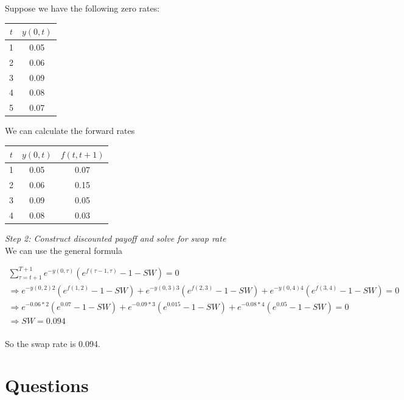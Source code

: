 Suppose we have the following zero rates:\\
\begin{center}
\begin{tabular}{|c|c|}
  \hline
  $t$ & $y(0,t)$ \\
  \hline
  1&0.05 \\
  2&0.06 \\
  3&0.09 \\
  4&0.08 \\
  5&0.07\\
  \hline
\end{tabular}
\end{center}
We can calculate the forward rates\\
\begin{center}
\begin{tabular}{|c|c|c|}
  \hline
  $t$ & $y(0,t)$ & $f(t,t+1)$ \\
  \hline
  1&0.05 & 0.07\\
  2&0.06 & 0.15\\
  3&0.09 & 0.05 \\
  4&0.08 & 0.03\\
  \hline
\end{tabular}
\end{center}

\textit{Step 2: Construct discounted payoff and solve for swap rate}\\

We can use the general formula

\begin{eqnarray*}
\sum_{\tau=t+1}^{T+1}  e^{-y(0,\tau)}(e^{f(\tau-1,\tau)}-1 -SW) = 0 \\
\Rightarrow e^{-y(0,2)2}(e^{f(1,2)} - 1 - SW) + e^{-y(0,3)3}(e^{f(2,3)} - 1 - SW)+ e^{-y(0,4)4}(e^{f(3,4)} - 1 - SW) =0\\
\Rightarrow e^{-0.06*2}(e^{0.07} - 1 - SW) + e^{-0.09*3}(e^{0.015} - 1 - SW)+ e^{-0.08*4}(e^{0.05} - 1 - SW) =0\\
\Rightarrow SW = 0.094\\
\end{eqnarray*}

So the swap rate is 0.094.

\section{Questions}

